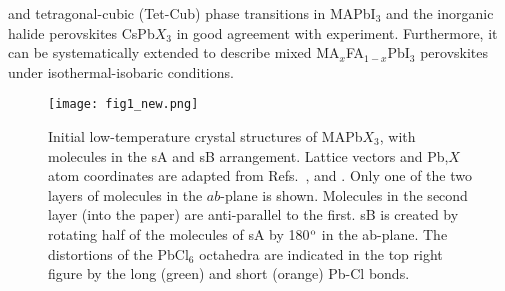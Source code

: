 \documentclass[journal=jpccck,manuscript=article,layout=twocolumn]{achemso}
\begin{document}
and tetragonal-cubic (Tet-Cub) phase transitions in MAPbI$_3$ and the inorganic halide perovskites CsPb$X_3$ in good agreement with experiment\cite{Jinnouchi:prl19}. Furthermore, it can be systematically extended to describe mixed MA$_x$FA$_{1-x}$PbI$_3$ perovskites under isothermal-isobaric conditions\cite{Grueninger:jpcc21}.


\begin{figure}[!t]
    \begin{center}
    \texttt{[image: fig1\_new.png]}
    \end{center}
   \caption{Initial low-temperature crystal structures of MAPb$X_3$, with molecules in the sA and sB arrangement. Lattice vectors and Pb,$X$ atom coordinates are adapted from Refs.~\cite{Baikie:jmca:13},\cite{Swainson:jssc03} and \cite{Chi:jssc05}. Only one of the two layers of molecules in the $ab$-plane is shown. Molecules in the second layer (into the paper) are anti-parallel to the first. sB is created by rotating half of the molecules of sA by 180$^{\rm o}$ in the ab-plane. The distortions of the PbCl$_6$ octahedra are indicated in the top right figure by the long (green) and short (orange) Pb-Cl bonds. }
\label{fig:1}
\end{figure}


\end{document}
